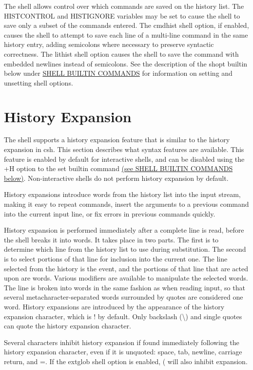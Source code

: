 The shell allows control over which commands are saved on the history list. The HISTCONTROL and HISTIGNORE variables may be set to cause the shell to save only a subset of the commands entered. The cmdhist shell option, if enabled, causes the shell to attempt to save each line of a multi-line command in the same history entry, adding semicolons where necessary to preserve syntactic correctness. The lithist shell option causes the shell to save the command with embedded newlines instead of semicolons. See the description of the shopt builtin below under \hyperref[sec:shellbuiltincommands]{SHELL BUILTIN COMMANDS} for information on setting and unsetting shell options.

\section{History Expansion}\label{sec:historyexpansion}
The shell supports a history expansion feature that is similar to the history expansion in csh. This section describes what syntax features are available. This feature is enabled by default for interactive shells, and can be disabled using the +H option to the set builtin command \hyperref[sec:shellbuiltincommands]{(see SHELL BUILTIN COMMANDS below)}. Non-interactive shells do not perform history expansion by default.

History expansions introduce words from the history list into the input stream, making it easy to repeat commands, insert the arguments to a previous command into the current input line, or fix errors in previous commands quickly.

History expansion is performed immediately after a complete line is read, before the shell breaks it into words. It takes place in two parts. The first is to determine which line from the history list to use during substitution. The second is to select portions of that line for inclusion into the current one. The line selected from the history is the event, and the portions of that line that are acted upon are words. Various modifiers are available to manipulate the selected words. The line is broken into words in the same fashion as when reading input, so that several metacharacter-separated words surrounded by quotes are considered one word. History expansions are introduced by the appearance of the history expansion character, which is ! by default. Only backslash (\textbackslash) and single quotes can quote the history expansion character.

Several characters inhibit history expansion if found immediately following the history expansion character, even if it is unquoted: space, tab, newline, carriage return, and =. If the extglob shell option is enabled, ( will also inhibit expansion.

